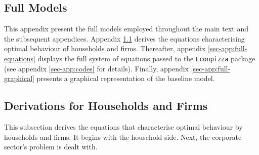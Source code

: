 \documentclass[a4paper,12pt]{article} %
\numberwithin{equation}{section} %
\numberwithin{figure}{section}
\numberwithin{table}{section}
\begin{document}
\newpage
\thispagestyle{plain}
\printbibliography[heading=bibintoc] %

\newpage
\begin{refsection}
\thispagestyle{plain}
\renewcommand*{\thepage}{A-\arabic{page}} %
\begin{appendices}
\section{Full Models}
\label{sec-app:full}

This appendix present the full models employed throughout the main text and the subsequent appendices. Appendix \ref{sec-app:full-derivations} derives the equations characterising optimal behaviour of households and firms. Thereafter, appendix \ref{sec-app:full-equations} displays the full system of equations passed to the \texttt{Econpizza} package (see appendix \ref{sec-app:codes} for details). Finally, appendix \ref{sec-app:full-graphical} presents a graphical representation of the baseline model.

\subsection{Derivations for Households and Firms}
\label{sec-app:full-derivations}

This subsection derives the equations that characterise optimal behaviour by households and firms. It begins with the household side. Next, the corporate sector's problem is dealt with.


\end{appendices}
\end{refsection}
\end{document}
